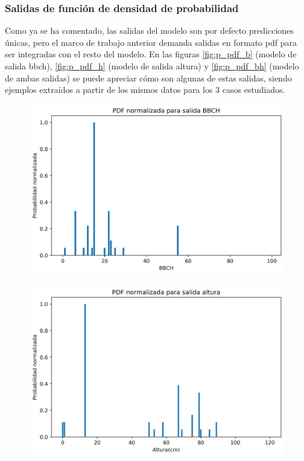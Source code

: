 \subsubsection{Salidas de función de densidad de probabilidad}
Como ya se ha comentado, las salidas del modelo son por defecto predicciones únicas, pero el marco de trabajo anterior demanda salidas en formato \gls{pdf} para ser integradas con el resto del modelo. En las figuras \ref{fig:p_pdf_b} (modelo de salida \gls{bbch}), \ref{fig:p_pdf_h} (modelo de salida altura) y \ref{fig:p_pdf_bh} (modelo de ambas salidas) se puede apreciar cómo son algunas de estas salidas, siendo ejemplos extraídos a partir de los mismos datos para los 3 casos estudiados. 
\\
\begin{figure}[h]
\centering
\includegraphics[width=0.85\linewidth]{archivos/tfg/Pixel/BBCH_PDF}
\end{figure}
\begin{figure}[h]
\centering
\includegraphics[width=0.85\linewidth]{archivos/tfg/Pixel/H_PDF}
\end{figure}

